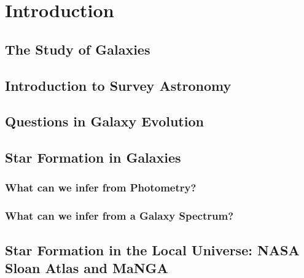 \chapter{Introduction}
\label{introduction}

\section{The Study of Galaxies}

\section{Introduction to Survey Astronomy}

\section{Questions in Galaxy Evolution}

\section{Star Formation in Galaxies}

\subsection{What can we infer from Photometry?}

\subsection{What can we infer from a Galaxy Spectrum?}

\section{Star Formation in the Local Universe: NASA Sloan Atlas and MaNGA}



